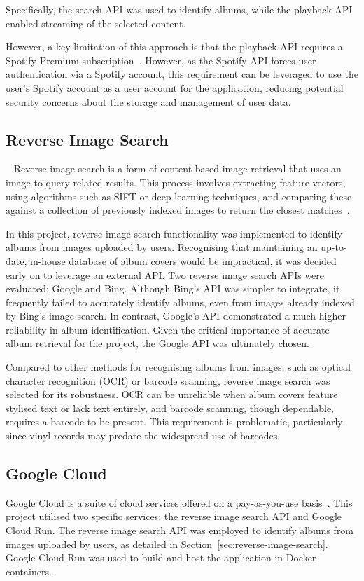Specifically, the search API was used to identify albums, while the playback API enabled streaming of the selected content.

However, a key limitation of this approach is that the playback API requires a Spotify Premium subscription~\cite{SpotifyPlaybackSDK}. However, as the Spotify API forces user authentication via a Spotify account, this requirement can be leveraged to use the user's Spotify account as a user account for the application, reducing potential security concerns about the storage and management of user data.

\subsection{Reverse Image Search}~\label{sec:reverse-image-search}
Reverse image search is a form of content-based image retrieval that uses an image to query related results. This process involves extracting feature vectors, using algorithms such as SIFT or deep learning techniques, and comparing these against a collection of previously indexed images to return the closest matches~\cite{Gaillard2017LargeSR}.

In this project, reverse image search functionality was implemented to identify albums from images uploaded by users. Recognising that maintaining an up-to-date, in-house database of album covers would be impractical, it was decided early on to leverage an external API. Two reverse image search APIs were evaluated: Google and Bing. Although Bing's API was simpler to integrate, it frequently failed to accurately identify albums, even from images already indexed by Bing's image search. In contrast, Google's API demonstrated a much higher reliability in album identification. Given the critical importance of accurate album retrieval for the project, the Google API was ultimately chosen.

Compared to other methods for recognising albums from images, such as optical character recognition (OCR) or barcode scanning, reverse image search was selected for its robustness. OCR can be unreliable when album covers feature stylised text or lack text entirely, and barcode scanning, though dependable, requires a barcode to be present. This requirement is problematic, particularly since vinyl records may predate the widespread use of barcodes.

\subsection{Google Cloud}
Google Cloud is a suite of cloud services offered on a pay-as-you-use basis~\cite{GCP}. This project utilised two specific services: the reverse image search API and Google Cloud Run. The reverse image search API was employed to identify albums from images uploaded by users, as detailed in Section~\ref{sec:reverse-image-search}. Google Cloud Run was used to build and host the application in Docker containers.

